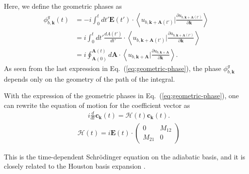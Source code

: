 Here, we define the geometric phases as
\begin{align}
	\phi^g_{b,\mathbf k}(t) & = -i\int^t_0 dt' \mathbf E(t')\cdot
	\left \langle u_{b,\mathbf k+\mathbf A(t')}\Big |\frac{\partial u_{b,\mathbf k+\mathbf A(t')}}{\partial
	\mathbf k} \right \rangle                                                                                                                                                                                     \\
	                        & =i\int^t_0 dt' \frac{dA(t')}{dt'}\cdot
	\left \langle u_{b,\mathbf k+\mathbf A(t')}\Big |\frac{\partial u_{b,\mathbf k+\mathbf A(t')}}{\partial \mathbf k} \right \rangle \nonumber                                                                   \\
	                        & = i \oint^{\mathbf A(t)}_{\mathbf A(0)} d\mathbf A \cdot \left \langle u_{b,\mathbf k+\mathbf A}\Big |\frac{\partial u_{b,\mathbf k+\mathbf A}}{\partial \mathbf k} \right \rangle.
	\label{eq;geometric-phase}
\end{align}
As seen from the last expression in Eq.~(\ref{eq;geometric-phase}), the phase $\phi^g_{b,\mathbf k}$ depends only on the geometry of the path of the integral.

With the expression of the geometric phases in Eq.~(\ref{eq;geometric-phase}), one can rewrite the equation of motion for the coefficient vector as
\begin{align}
	 & i\frac{d}{dt} \mathbf c_{\mathbf k}(t) = \mathcal{H}(t) \mathbf c_{\mathbf k}(t)
	.
	\label{eq:tdse-ad-basis_A}
\end{align}
\begin{align}
	 & \mathcal{H}(t)=
	i\mathbf E(t)\cdot \left(
	\begin{array}{cc}
			0      & M_{12} \\
			M_{21} & 0
		\end{array}
	\right)
\end{align}

This is the time-dependent Schr\"odinger equation on the adiabatic basis, and it is closely related to the Houston basis expansion \cite{PhysRev.57.184,PhysRevB.33.5494}.
